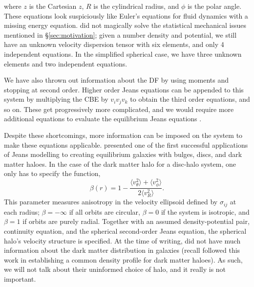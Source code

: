 where $z$ is the Cartesian $z$, $R$ is the cylindrical radius, and $\phi$ is the polar angle. These equations look suspiciously like Euler's equations for fluid dynamics with a missing energy equation. \citet{jeans_1915} did not magically solve the statistical mechanical issues mentioned in \S\ref{sec:motivation}; given a number density and potential, we still have an unknown velocity dispersion tensor with six elements, and only 4 independent equations. In the simplified spherical case, we have three unknown elements and two independent equations.

We have also thrown out information about the DF by using moments and stopping at second order. Higher order Jeans equations can be appended to this system by multiplying the CBE by $v_i v_j v_k$ to obtain the third order equations, and so on. These get progressively more complicated, and we would require more additional equations to evaluate the equilibrium Jeans equations \citep{BT}.

Despite these shortcomings, more information can be imposed on the system to make these equations applicable. \citet{hernquist_1993} presented one of the first successful applications of Jeans modelling to creating equilibrium galaxies with bulges, discs, and dark matter haloes. In the case of the dark matter halo for a disc-halo system, one only has to specify the function,
\begin{equation}
\beta(r) = 1 - \frac{\langle v_\theta^2\rangle + \langle v_\phi^2 \rangle}{2 \langle v_R^2 \rangle}.
\end{equation}
This parameter measures anisotropy in the velocity ellipsoid defined by $\sigma_{ij}$ at each radius; $\beta = -\infty$ if all orbits are circular, $\beta=0$ if the system is isotropic, and $\beta = 1$ if orbits are purely radial. Together with an assumed density-potential pair, continuity equation, and the spherical second-order Jeans equation, the spherical halo's velocity structure is specified. At the time of writing, \citet{hernquist_1993} did not have much information about the dark matter distribution in galaxies (recall \citep{nfw} followed this work in establishing a common density profile for dark matter haloes). As such, we will not talk about their uninformed choice of halo, and it really is not important.

